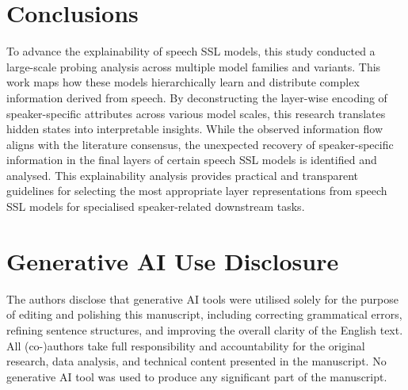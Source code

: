 \documentclass[cameraready]{Interspeech}
\begin{document}
\section{Conclusions}


To advance the explainability of speech SSL models, this study conducted a large-scale probing analysis across multiple model families and variants. This work maps how these models hierarchically learn and distribute complex information derived from speech. By deconstructing the layer-wise encoding of speaker-specific attributes across various model scales, this research translates hidden states into interpretable insights. While the observed information flow aligns with the literature consensus, the unexpected recovery of speaker-specific information in the final layers of certain speech SSL models is identified and analysed. This explainability analysis provides practical and transparent guidelines for selecting the most appropriate layer representations from speech SSL models for specialised speaker-related downstream tasks.


\section{Generative AI Use Disclosure}

The authors disclose that generative AI tools were utilised solely for the purpose of editing and polishing this manuscript, including correcting grammatical errors, refining sentence structures, and improving the overall clarity of the English text. All (co-)authors take full responsibility and accountability for the original research, data analysis, and technical content presented in the manuscript. No generative AI tool was used to produce any significant part of the manuscript.




\end{document}
